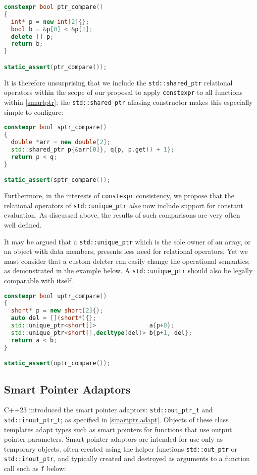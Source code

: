 \documentclass[10pt]{article}
\newcommand*{\wgxxi}[1]{[\href{https://wg21.link/#1}{#1}]}
\begin{document}
\begin{lstlisting}[language=cpp]
constexpr bool ptr_compare()
{
  int* p = new int[2]{};
  bool b = &p[0] < &p[1];
  delete [] p;
  return b;
}

static_assert(ptr_compare());
\end{lstlisting}

It is therefore unsurprising that we include the \texttt{std::shared\_ptr}
relational operators within the scope of our proposal to apply
\texttt{constexpr} to all functions within \wgxxi{smartptr}; the
\texttt{std::shared\_ptr} aliasing constructor makes this especially simple to
configure:

\begin{lstlisting}[language=cpp]
constexpr bool sptr_compare()
{
  double *arr = new double[2];
  std::shared_ptr p{&arr[0]}, q{p, p.get() + 1};
  return p < q;
}

static_assert(sptr_compare());
\end{lstlisting}

Furthermore, in the interests of \texttt{constexpr} consistency, we propose
that the relational operators of \texttt{std::unique\_ptr} \emph{also} now
include support for constant evaluation. As discussed above, the results of
such comparisons are very often well defined.

It may be argued that a \texttt{std::unique\_ptr} which is the sole owner of an
array, or an object with data members, presents less need for relational
operators. Yet we must consider that a custom deleter can easily change the
operational semantics; as demonstrated in the example below. A
\texttt{std::unique\_ptr} should also be legally comparable with itself.

\begin{lstlisting}[language=cpp]
constexpr bool uptr_compare()
{
  short* p = new short[2]{};
  auto del = [](short*){};
  std::unique_ptr<short[]>               a{p+0};
  std::unique_ptr<short[],decltype(del)> b{p+1, del};
  return a < b;
}

static_assert(uptr_compare());
\end{lstlisting}

\subsection{Smart Pointer Adaptors}
\label{sec:adapt}

C++23 introduced the smart pointer adaptors: \texttt{std::out\_ptr\_t} and
\texttt{std::inout\_ptr\_t}; as specified in \wgxxi{smartptr.adapt}. Objects of
these class templates adapt types such as smart pointers for functions that use
output pointer parameters. Smart pointer adaptors are intended for use only as
temporary objects, often created using the helper functions
\texttt{std::out\_ptr} or \texttt{std::inout\_ptr}, and typically created and
destroyed as arguments to a function call such as \texttt{f} below:
\end{document}

